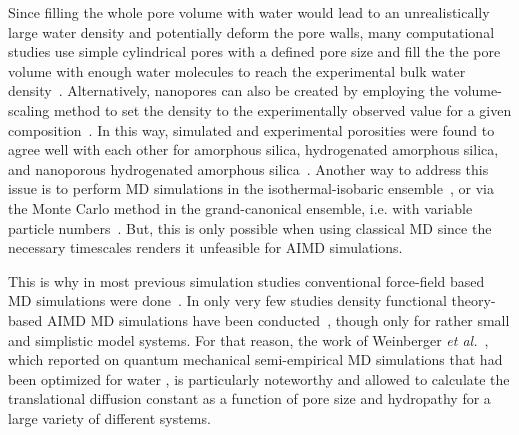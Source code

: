 \documentclass[AMA,STIX2COL]{WileyNJD-v2} %
\begin{document}
Since filling the whole pore volume with water would lead to an unrealistically large water density and potentially deform the pore walls, many computational studies use simple cylindrical pores with a defined pore size and fill the the pore volume with enough water molecules to reach the experimental bulk water density~\cite{Allolio_2014,hartnig2000}. Alternatively, nanopores can also be created by employing the volume-scaling method to set the density to the experimentally observed value for a given composition~\cite{Nakano1994,Kieffer1988}. In this way, simulated and experimental porosities were found to agree well with each other for amorphous silica, hydrogenated amorphous silica, and nanoporous hydrogenated amorphous silica~\cite{Gergs2022}. Another way to address this issue is to perform MD simulations in the isothermal-isobaric ensemble~\cite{mosaddeghi2012, ghoufi2011}, or via the Monte Carlo method in the grand-canonical ensemble, i.e. with variable particle numbers~\cite{shroll1999molecular,shevade2000molecular}. But, this is only possible when using classical MD since the necessary timescales renders it unfeasible for AIMD simulations.


This is why in most previous simulation studies conventional force-field based MD simulations were done~\cite{Lerbret_2011,Bourg_2012,Renou_2014,Gallo_2012}. In only very few studies density functional theory-based AIMD MD simulations have been conducted~\cite{Sulpizi_2012,Cimas_2014,Allolio_2014}, though only for rather small and simplistic model systems. For that reason, the work of Weinberger \textit{et al.}~\cite{Weinberger_2022}, which reported on quantum mechanical semi-empirical MD simulations that had been optimized for water \cite{Voorhis2015}, is particularly noteworthy and allowed to calculate the translational diffusion constant as a function of pore size and hydropathy for a large variety of different systems.
\end{document}
